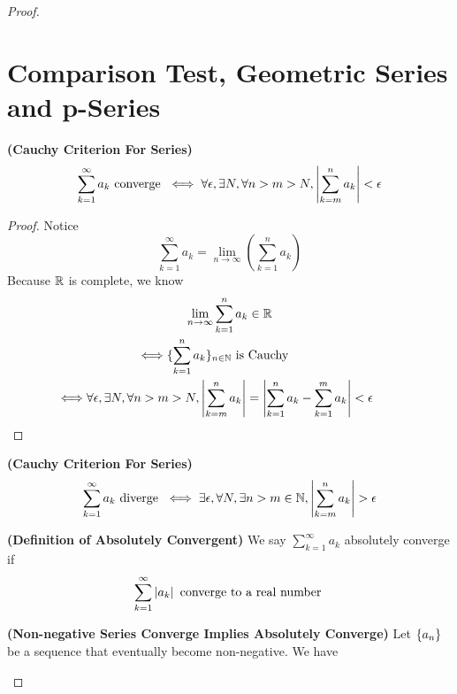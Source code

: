 \documentclass{report}
\begin{document}
\begin{proof}
\section{Comparison Test, Geometric Series and p-Series}
\begin{theorem}
\label{2.2.1}
\textbf{(Cauchy Criterion For Series)} 
\begin{equation}
  \sum_{k=1}^\infty a_k\text{ converge }\iff \forall \epsilon , \exists N, \forall n>m>N, \left|\sum_{k=m}^n a_k\right|<\epsilon   
\end{equation}
\end{theorem}
\begin{proof}
Notice 
\begin{equation}
\sum_{k=1}^\infty a_k=\lim_{n\to\infty} (\sum_{k=1}^n a_k)
\end{equation}
Because $\mathbb{R}$ is complete, we know  
 \begin{gather}
\lim_{n\to\infty}\sum_{k=1}^n a_k\inr\\
\liff \set{\sum_{k=1}^n a_k}_{n\inn}\text{ is Cauchy }\\
\liff \forall \epsilon ,\exists N,\forall n>m>N, \abso{\sum_{k=m}^n a_k}=\abso{\sum_{k=1}^n a_k- \sum_{k=1}^m a_k}<\epsilon 
\end{gather}
\end{proof}
\begin{corollary}
\label{2.2.2}
\textbf{(Cauchy Criterion For Series)} 
\begin{equation}
  \sum_{k=1}^\infty a_k\text{ diverge }\iff \exists \epsilon, \forall N, \exists  n>m \inn, \abso{\sum_{k=m}^n a_k}>\epsilon 
\end{equation}
\end{corollary}
\begin{definition}
\label{2.2.3}
\textbf{(Definition of Absolutely Convergent)} We say $\sum_{k=1}^\infty a_k$ absolutely converge if 
\begin{equation}
 \sum_{k=1}^\infty \left|a_k\right| \text{ converge to a real number }
\end{equation}
\end{definition}
\begin{theorem}
\label{2.2.4}
\textbf{(Non-negative Series Converge Implies Absolutely Converge)} Let $\{ a_n \}$ be a sequence that eventually become non-negative. We have

\end{theorem}
\end{proof}
\end{document}
